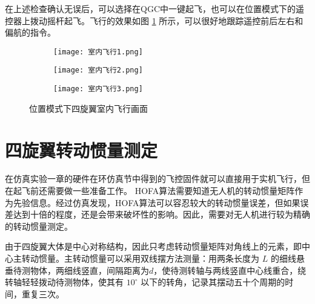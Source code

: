 在上述检查确认无误后，可以选择在QGC中一键起飞，也可以在位置模式下的遥控器上拨动摇杆起飞。飞行的效果如图 \ref{室内飞行} 所示，可以很好地跟踪遥控前后左右和偏航的指令。
\begin{figure}[h]
  \centering
  \begin{subfigure}[c]{0.33\textwidth}
    \centering
    \texttt{[image: 室内飞行1.png]}
  \end{subfigure} \hfill
  \begin{subfigure}[c]{0.33\textwidth}
    \centering
    \texttt{[image: 室内飞行2.png]}
  \end{subfigure}\hfill
    \begin{subfigure}[c]{0.33\textwidth}
      \centering
      \texttt{[image: 室内飞行3.png]}
  \end{subfigure}
  \caption{位置模式下四旋翼室内飞行画面}
  \label{室内飞行}
  \end{figure}
\newpage
  \section{四旋翼转动惯量测定}
  在仿真实验一章的硬件在环仿真节中得到的飞控固件就可以直接用于实机飞行，但在起飞前还需要做一些准备工作。
  HOFA算法需要知道无人机的转动惯量矩阵作为先验信息。经过仿真发现，HOFA算法可以容忍较大的转动惯量误差，但如果误差达到十倍的程度，还是会带来破坏性的影响。因此，需要对无人机进行较为精确的转动惯量测定。

  由于四旋翼大体是中心对称结构，因此只考虑转动惯量矩阵对角线上的元素，即中心主转动惯量。主转动惯量可以采用双线摆方法测量\cite{转动惯量}：用两条长度为 $L$ 的细线悬垂待测物体，两细线竖直，间隔距离为$d$，使待测转轴与两线竖直中心线重合，绕转轴轻轻拨动待测物体，使其有 $10 ^\circ$ 以下的转角，记录其摆动五十个周期的时间，重复三次。

